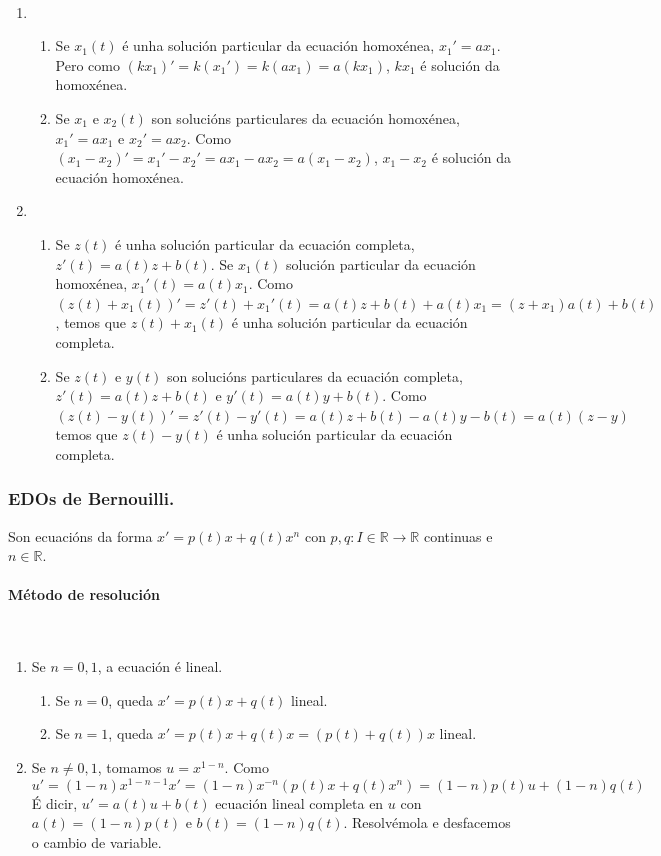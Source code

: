 \documentclass[11pt, a4paper,twoside]{article}
\makeatletter
\theoremstyle{theorem-style}  %
\renewenvironment{proof}[1][\proofname]{\par
	\pushQED{\qed}%
	\normalfont \topsep6\p@\@plus6\p@\relax
	\list{}{%
		\settowidth{\leftmargin}{\quad:\hskip\labelsep}%
		\setlength{\labelwidth}{0pt}%
		\setlength{\itemindent}{-\leftmargin}%
	}%
	\item[\hskip\labelsep\itshape#1\@addpunct{:}]\ignorespaces
}{%
	\popQED\endlist\@endpefalse
}
\theoremstyle{definition-style}
\theoremstyle{example-style}
\makeatother
\begin{document}
\begin{proof} \ 
	\begin{enumerate}
		\item \ 
		\begin{enumerate}[\quad a)]
			\item Se $ x_1(t) $ é unha solución particular da ecuación homoxénea, $ x_1'=ax_1 $. Pero como $ (kx_1)'=k(x_1')=k(ax_1)=a(kx_1) $, $ kx_1 $ é solución da homoxénea.
			\item Se $ x_1 $ e $ x_2(t) $ son solucións particulares da ecuación homoxénea,  $ x_1'=ax_1 $ e  $ x_2'=ax_2 $. Como $ (x_1-x_2)'=x_1'-x_2'=ax_1-ax_2=a(x_1-x_2) $, $ x_1-x_2 $ é solución da ecuación homoxénea.
		\end{enumerate}
		\item \ 
		\begin{enumerate}[\quad a)]
			\item Se $ z(t) $ é unha solución particular da ecuación completa, $ z'(t)=a(t)z+b(t) $. Se $ x_1(t) $ solución particular da ecuación homoxénea, $ x_1'(t)=a(t)x_1 $. Como $ (z(t)+x_1(t))'=z'(t)+x_1'(t)=a(t)z+b(t)+a(t)x_1 = (z+x_1)a(t)+b(t)$, temos que $ z(t)+x_1(t)$ é unha solución particular da ecuación completa.
			\item Se $ z(t) $ e $ y(t) $ son solucións particulares da ecuación completa, $ z'(t)=a(t)z+b(t) $ e $ y'(t)=a(t)y+b(t) $. Como $ (z(t)-y(t))'=z'(t)-y'(t)=a(t)z+b(t) - a(t)y-b(t)=a(t)(z-y) $ temos que $ z(t)-y(t) $ é unha solución particular da ecuación completa.
		\end{enumerate}
	\end{enumerate}
\end{proof}
\subsubsection{EDOs de Bernouilli.}
Son ecuacións da forma $ x'=p(t)x+q(t)x^n $ con $ p,q: I\in\mathbb{R}\longrightarrow \mathbb{R} $ continuas e $ n\in\mathbb{R} $.
\paragraph{Método de resolución} \ 
\begin{enumerate}
	\item Se $ n=0,1 $, a ecuación é lineal.
	\begin{enumerate}
		\item Se $ n=0 $, queda $ x'=p(t)x+q(t) $ lineal.
		\item Se $ n=1 $, queda $ x'=p(t)x+q(t)x=(p(t)+q(t))x $ lineal.
	\end{enumerate} 
	\item Se $ n\neq 0,1 $, tomamos $ u=x^{1-n} $. Como 
	\[ u'=(1-n)x^{1-n-1}x'=(1-n)x^{-n}(p(t)x+q(t)x^n)=(1-n)p(t)u+(1-n)q(t) \]
	É dicir, $ u'=a(t)u+b(t) $ ecuación lineal completa en $ u $ con $ a(t)=(1-n)p(t) $ e $ b(t)=(1-n)q(t) $. Resolvémola e desfacemos o cambio de variable.
\end{enumerate}
\end{document}
